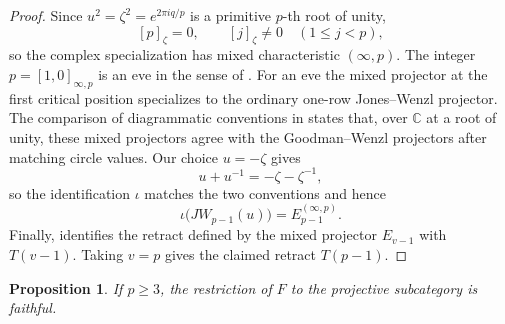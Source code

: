 \documentclass[12pt,leqno]{amsart}
\numberwithin{equation}{section}
\newtheorem{prop}[thm]{Proposition}
\def\C{\mathbb{C}}
\begin{document}
\begin{proof}
Since $u^2=\zeta^2=e^{2\pi iq/p}$ is a primitive $p$-th root of unity,
\[
 [p]_\zeta=0,\qquad [j]_\zeta\ne0\quad(1\le j<p),
\]
so the complex specialization has mixed characteristic
$(\infty,p)$.  The integer $p=[1,0]_{\infty,p}$ is an eve in the sense
of \cite[Definition~2.5]{SuttonTubbenhauerWedrichZhu}.  For an eve the
mixed projector at the first critical position specializes to the
ordinary one-row Jones--Wenzl projector.  The comparison of diagrammatic
conventions in \cite[Section~1.3(b)]{SuttonTubbenhauerWedrichZhu}
states that, over $\C$ at a root of unity, these mixed projectors agree
with the Goodman--Wenzl projectors after matching circle values.  Our
choice $u=-\zeta$ gives
\[
 u+u^{-1}=-\zeta-\zeta^{-1},
\]
so the identification $\iota$ matches the two conventions and hence
\[
 \iota\bigl(JW_{p-1}(u)\bigr)=E_{p-1}^{(\infty,p)}.
\]
Finally, \cite[Theorem~3.18]{SuttonTubbenhauerWedrichZhu} identifies the
retract defined by the mixed projector $E_{v-1}$ with $T(v-1)$.
Taking $v=p$ gives the claimed retract $T(p-1)$.
\end{proof}

\begin{prop}\label{prop:F-faithful-projectives-large}
If $p\geq3$, the restriction of $F$ to the projective subcategory is
faithful.
\end{prop}
\end{document}
